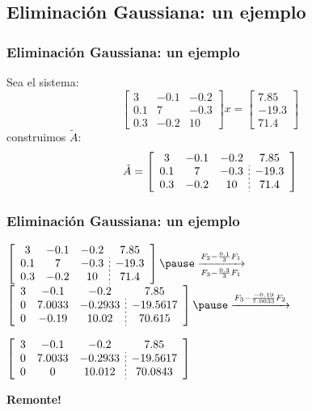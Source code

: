 \documentclass[xcolor=svgnames]{beamer} %
\theoremstyle{plain}
\renewcommand{\textbf}[1]{{\bfseries\textcolor{redUnq2}{#1}}}
\theoremstyle{definition}
\begin{document}

\subsection{Eliminación Gaussiana: un ejemplo}

\begin{frame}
\frametitle{Eliminación Gaussiana: un ejemplo}
Sea el sistema:
$$\begin{bmatrix}
3 & -0.1 & -0.2 \\
0.1 & 7 & -0.3\\
0.3 & -0.2 & 10
\end{bmatrix} x = \begin{bmatrix}
7.85\\
-19.3\\
71.4
\end{bmatrix}$$
construimos $\tilde A$:
$$\tilde A = \left[\begin{array}{ccc;{2pt/2pt}c}
 3 & -0.1 & -0.2 & 7.85\\
 0.1 & 7 & -0.3 & -19.3\\
 0.3 & -0.2 & 10 & 71.4
\end{array}\right]$$

\end{frame}




\begin{frame}
\frametitle{Eliminación Gaussiana: un ejemplo}

$\left[\begin{array}{ccc;{2pt/2pt}c}
 3 & -0.1 & -0.2 & 7.85\\
 0.1 & 7 & -0.3 & -19.3\\
 0.3 & -0.2 & 10 & 71.4
\end{array}\right] \pause \xrightarrow[ F_3 -\frac{0.3}{3} F_1]{F_2 -\frac{0.1}{3} F_1 }$
$\left[\begin{array}{ccc;{2pt/2pt}c}
   	3	& -0.1		& -0.2 		& 7.85\\
 	0	& 7.0033		& -0.2933 	& -19.5617\\
 	0	& -0.19 		& 10.02 		& 70.615
\end{array}\right] \pause \xrightarrow{F_3 -\frac{-0.19}{7.0033} F_2 }$

$\left[\begin{array}{ccc;{2pt/2pt}c}
   	3	& -0.1		& -0.2 		& 7.85\\
 	0	& 7.0033		& -0.2933 	& -19.5617\\
 	0	& 0	 		& 10.012		& 70.0843
\end{array}\right]$

\pause
\begin{center}
\textbf{Remonte!}
\end{center}
\end{frame}
\end{document}
